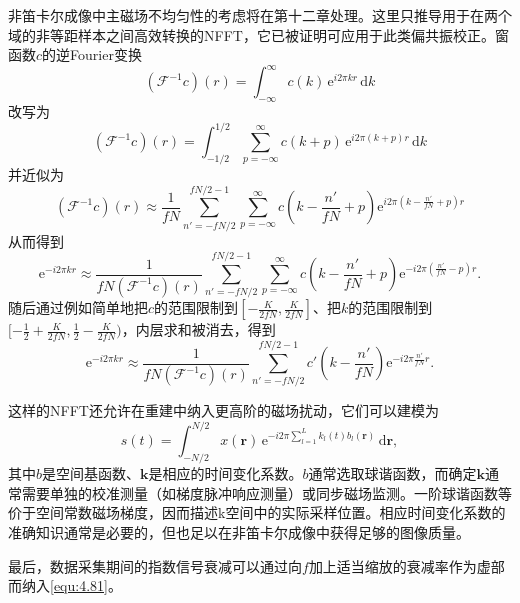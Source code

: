 \documentclass[12pt]{article}
\let\originallautoref\autoref
\renewcommand{\autoref}[1]{\allowbreak\originallautoref{#1}}
\begin{document}
非笛卡尔成像中主磁场不均匀性的考虑将在第十二章处理。这里只推导用于在两个域的非等距样本之间高效转换的NFFT，它已被证明可应用于此类偏共振校正。窗函数$c$的逆Fourier变换
\begin{equation}
    \left(\mathcal{F}^{-1}c\right)(r)=\int_{-\infty}^{\infty}c(k)\,\mathrm{e}^{i2\pi kr}\,\mathrm{d}k
    \label{equ:4.82}
\end{equation}
改写为
\begin{equation}
    \left(\mathcal{F}^{-1}c\right)(r)=\int_{-1/2}^{1/2}\sum_{p=-\infty}^{\infty}c(k+p)\,\mathrm{e}^{i2\pi(k+p)r}\,\mathrm{d}k
    \label{equ:4.83}
\end{equation}
并近似为
\begin{equation}
    \left(\mathcal{F}^{-1}c\right)(r)\approx\frac{1}{fN}\sum_{n'=-fN/2}^{fN/2-1}\sum_{p=-\infty}^{\infty}c\left(k-\frac{n'}{fN}+p\right)\mathrm{e}^{i2\pi\left(k-\frac{n'}{fN}+p\right)r}
    \label{equ:4.84}
\end{equation}
从而得到
\begin{equation}
    \mathrm{e}^{-i2\pi kr}\approx\frac{1}{fN\left(\mathcal{F}^{-1}c\right)(r)}\sum_{n'=-fN/2}^{fN/2-1}\sum_{p=-\infty}^{\infty}c\left(k-\frac{n'}{fN}+p\right)\mathrm{e}^{-i2\pi\left(\frac{n'}{fN}-p\right)r}.
    \label{equ:4.85}
\end{equation}
随后通过例如简单地把$c$的范围限制到$[-\frac{K}{2fN},\frac{K}{2fN}]$、把$k$的范围限制到$[-\frac{1}{2}+\frac{K}{2fN},\frac{1}{2}-\frac{K}{2fN})$，内层求和被消去，得到
\begin{equation}
    \mathrm{e}^{-i2\pi kr}\approx\frac{1}{fN\left(\mathcal{F}^{-1}c\right)(r)}\sum_{n'=-fN/2}^{fN/2-1}c'\left(k-\frac{n'}{fN}\right)\mathrm{e}^{-i2\pi\frac{n'}{fN}r}.
    \label{equ:4.86}
\end{equation}

这样的NFFT还允许在重建中纳入更高阶的磁场扰动，它们可以建模为
\begin{equation}
    s(t)=\int_{-N/2}^{N/2}x(\bm{r})\,\mathrm{e}^{-i2\pi\sum_{l=1}^{L}k_l(t)b_l(\bm{r})}\,\mathrm{d}\bm{r},
    \label{equ:4.87}
\end{equation}
其中$b$是空间基函数、$\bm{k}$是相应的时间变化系数。$b$通常选取球谐函数，而确定$\bm{k}$通常需要单独的校准测量（如梯度脉冲响应测量）或同步磁场监测。一阶球谐函数等价于空间常数磁场梯度，因而描述k空间中的实际采样位置。相应时间变化系数的准确知识通常是必要的，但也足以在非笛卡尔成像中获得足够的图像质量。

最后，数据采集期间的指数信号衰减可以通过向$f$加上适当缩放的衰减率作为虚部而纳入\autoref{equ:4.81}。
\end{document}
